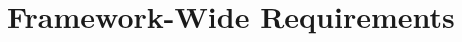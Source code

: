 \documentclass[english]{article}
\newcommand{\shortname}{GR}
\begin{document}






\newpage

\setcounter{section}{0}
\renewcommand{\thesection}{\shortname\arabic{section}}
\renewcommand{\thesubsection}{\shortname\arabic{section}.\arabic{subsection}}
\renewcommand{\thesubsubsection}{\shortname\arabic{section}.\arabic{subsection}.\arabic{subsubsection}}

\begin{htmlonly}
\end{htmlonly}
\part{Framework-Wide Requirements}



 

\end{document}

